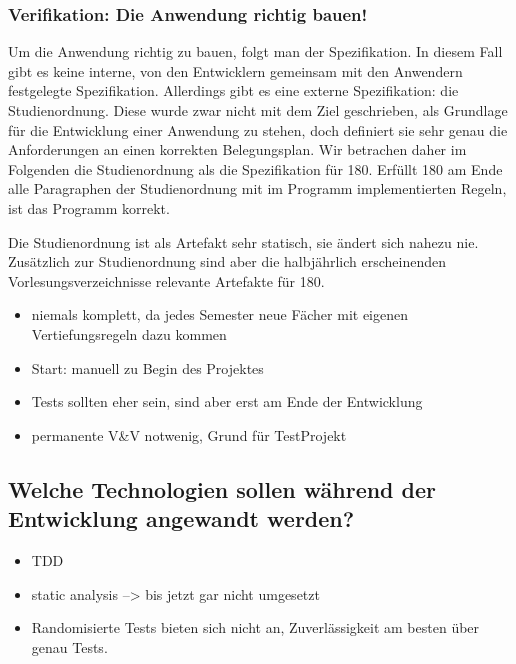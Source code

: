 \documentclass[ngerman]{article}
\begin{document}
\subsubsection{Verifikation: Die Anwendung richtig bauen!}

Um die Anwendung richtig zu bauen, folgt man der Spezifikation. In
diesem Fall gibt es keine interne, von den Entwicklern gemeinsam mit den
Anwendern festgelegte Spezifikation. Allerdings gibt es eine externe
Spezifikation: die Studienordnung. Diese wurde zwar nicht mit dem Ziel
geschrieben, als Grundlage für die Entwicklung einer Anwendung zu
stehen, doch definiert sie sehr genau die Anforderungen an einen
korrekten Belegungsplan. Wir betrachen daher im Folgenden die
Studienordnung als die Spezifikation für 180. Erfüllt 180 am Ende alle
Paragraphen der Studienordnung mit im Programm implementierten Regeln,
ist das Programm korrekt.

Die Studienordnung ist als Artefakt sehr statisch, sie ändert sich nahezu nie.
Zusätzlich zur Studienordnung sind aber die halbjährlich erscheinenden Vorlesungsverzeichnisse relevante Artefakte für 180.

\begin{itemize}
    \item
        niemals komplett, da jedes Semester neue Fächer mit eigenen Vertiefungsregeln dazu kommen 
    \item
        Start: manuell zu Begin des Projektes
    \item
        Tests sollten eher sein, sind aber erst am Ende der Entwicklung
    \item
        permanente V\&V notwenig, Grund für TestProjekt
\end{itemize}

\subsection{Welche Technologien sollen während der Entwicklung angewandt werden?}

\begin{itemize}
    \item
        TDD
    \item
        static analysis --\textgreater{} bis jetzt gar nicht umgesetzt
    \item
        Randomisierte Tests bieten sich nicht an, Zuverlässigkeit am besten über genau Tests.
\end{itemize}
\end{document}
